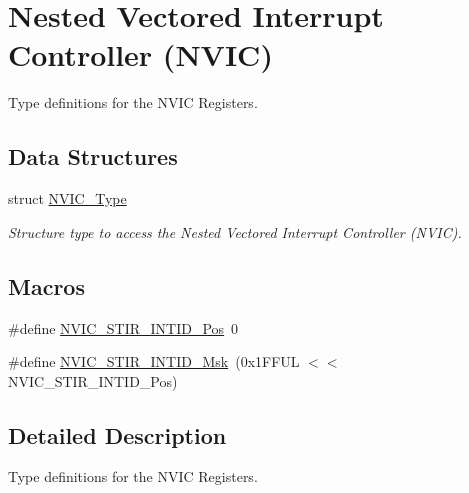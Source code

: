 \hypertarget{group__CMSIS__NVIC}{\section{Nested Vectored Interrupt Controller (N\-V\-I\-C)}
\label{group__CMSIS__NVIC}
}


Type definitions for the N\-V\-I\-C Registers.  


\subsection*{Data Structures}
\begin{DoxyCompactItemize}
\item 
struct \hyperlink{structNVIC__Type}{N\-V\-I\-C\-\_\-\-Type}
\begin{DoxyCompactList}\small\item\em Structure type to access the Nested Vectored Interrupt Controller (N\-V\-I\-C). \end{DoxyCompactList}\end{DoxyCompactItemize}
\subsection*{Macros}
\begin{DoxyCompactItemize}
\item 
\#define \hyperlink{group__CMSIS__NVIC_ga9eebe495e2e48d302211108837a2b3e8}{N\-V\-I\-C\-\_\-\-S\-T\-I\-R\-\_\-\-I\-N\-T\-I\-D\-\_\-\-Pos}~0
\item 
\#define \hyperlink{group__CMSIS__NVIC_gae4060c4dfcebb08871ca4244176ce752}{N\-V\-I\-C\-\_\-\-S\-T\-I\-R\-\_\-\-I\-N\-T\-I\-D\-\_\-\-Msk}~(0x1\-F\-F\-U\-L $<$$<$ N\-V\-I\-C\-\_\-\-S\-T\-I\-R\-\_\-\-I\-N\-T\-I\-D\-\_\-\-Pos)
\end{DoxyCompactItemize}


\subsection{Detailed Description}
Type definitions for the N\-V\-I\-C Registers. 

